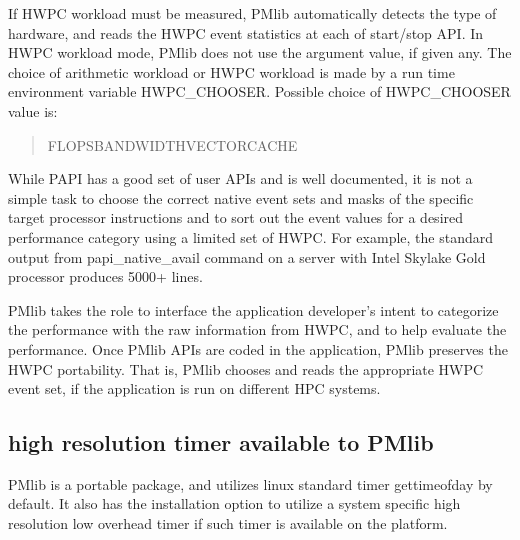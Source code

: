 \documentclass[conference]{IEEEtran}
\begin{document}
If HWPC workload must be measured,
PMlib automatically detects the type of hardware, and reads the HWPC
event statistics at each of start/stop API.
In HWPC workload mode, PMlib does not use the argument value, if given any.
The choice of arithmetic workload or HWPC workload is made by a
run time environment variable HWPC\_CHOOSER.
Possible choice of HWPC\_CHOOSER value is:
\begin{quote}
\begin{small}
FLOPS\textbar BANDWIDTH\textbar VECTOR\textbar CACHE
\end{small}
\end{quote}


While PAPI has a good set of user APIs and is well documented,
it is not a simple task to choose the correct native event sets and masks
of the specific target processor instructions and to sort out the event
values for a desired performance category using a limited set of HWPC.
For example,
the standard output from papi\_native\_avail command on a server with
Intel Skylake Gold processor produces 5000+ lines.

PMlib takes the role to interface the application developer's intent to
categorize the performance with the raw information from HWPC, and to
help evaluate the performance.
Once PMlib APIs are coded in the application, PMlib preserves the HWPC
portability. That is, PMlib chooses and reads the appropriate HWPC event
set, if the application is run on different HPC systems.









\subsection{high resolution timer available to PMlib}
PMlib is a portable package, and utilizes linux standard timer
gettimeofday by default. It also has the installation option to utilize
a system specific high resolution low overhead timer if such timer is
available on the platform.
\end{document}
